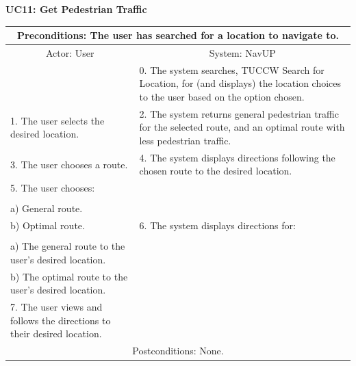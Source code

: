 \documentclass{article}
\begin{document}
				\vspace{5mm}
                \begin{flushleft}
                \textbf{UC11: Get Pedestrian Traffic}\\
                \end{flushleft}
        		\centering		
       		 \small
       		 \begin{tabular}{|p{8cm}|p{8cm}|}
       		 \hline
       		\multicolumn{2}{c}{ Preconditions: The user has searched for a location to navigate to.} \\
       		 \hline
       		\multicolumn{1}{c}{Actor: User} & \multicolumn{1}{c}{ System: NavUP} \\
        		\hline
       		  & 0.	The system searches, TUCCW Search for Location, for (and displays) the location choices to the user based on the option chosen.\\
       		 \hline
       		 1.	The user selects the desired location. & 2.	The system returns general pedestrian traffic for the selected route, and an optimal route with less pedestrian traffic.\\
        		\hline
       		 3.	The user chooses a route. & 4.	The system displays directions following the chosen route to the desired location.\\
        		\hline
       		 5.	The user chooses:\\

						\\a)	General route.
					\\	b)	Optimal route.
			 & 6.	The system displays directions for:\\

					\\a)	The general route to the user's desired location.
					\\b)	The optimal route to the user's desired location.
 \\
        		\hline
        		7.	The user views and follows the directions to their desired location. & \\
       		 \hline
        		\multicolumn{2}{c}{Postconditions: None.} \\
        		\hline
        \end{tabular} 
     
     \newpage
     
\end{document}
